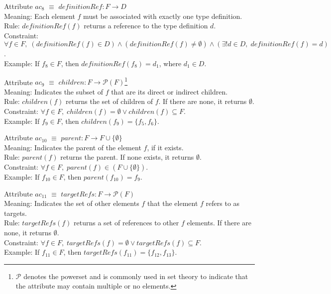 \documentclass{article}
\begin{document}
\vspace{0.8em}

Attribute \( ac_8 \) $\equiv$ \( definitionRef : F \rightarrow D \) \\
Meaning: Each element \( f \) must be associated with exactly one type definition. \\
Rule: \( definitionRef(f) \) returns a reference to the type definition \( d \). \\
Constraint: \( \forall f \in F,\; (definitionRef(f) \in D) \wedge (definitionRef(f) \neq \emptyset) \wedge (\exists!d \in D,\; definitionRef(f) = d) \). \\
Example: If \( f_8 \in F \), then \( definitionRef(f_8) = d_1 \), where \( d_1 \in D \).

\vspace{0.8em}

Attribute \( ac_9 \) $\equiv$ \( children : F \rightarrow \mathcal{P}(F) \)\footnote{\( \mathcal{P} \) denotes the powerset and is commonly used in set theory to indicate that the attribute may contain multiple or no elements.} \\
Meaning: Indicates the subset of \( f \) that are its direct or indirect children. \\
Rule: \( children(f) \) returns the set of children of \( f \). If there are none, it returns \( \emptyset \). \\
Constraint: \( \forall f \in F,\; children(f) = \emptyset \vee children(f) \subseteq F \). \\
Example: If \( f_9 \in F \), then \( children(f_9) = \{ f_5, f_6 \} \).

\vspace{0.8em}

Attribute \( ac_{10} \) $\equiv$ \( parent : F \rightarrow F \cup \{ \emptyset \} \) \\
Meaning: Indicates the parent of the element \( f \), if it exists. \\
Rule: \( parent(f) \) returns the parent. If none exists, it returns \( \emptyset \). \\
Constraint: \( \forall f \in F,\; parent(f) \in (F \cup \{ \emptyset \}) \). \\
Example: If \( f_{10} \in F \), then \( parent(f_{10}) = f_9 \).

\vspace{0.8em}

Attribute \( ac_{11} \) $\equiv$ \( targetRefs : F \rightarrow \mathcal{P}(F) \) \\
Meaning: Indicates the set of other elements \( f \) that the element \( f \) refers to as targets. \\
Rule: \( targetRefs(f) \) returns a set of references to other \( f \) elements. If there are none, it returns \( \emptyset \). \\
Constraint: \( \forall f \in F,\; targetRefs(f) = \emptyset \vee targetRefs(f) \subseteq F \). \\
Example: If \( f_{11} \in F \), then \( targetRefs(f_{11}) = \{ f_{12}, f_{13} \} \).
\end{document}
